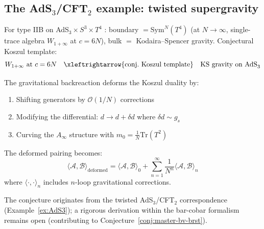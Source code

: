 \subsection{\texorpdfstring{The AdS$_3$/CFT$_2$ example: twisted supergravity}{The AdS 3/CFT 2 example: twisted supergravity}}

\begin{example}\label{ex:AdS3}
For type IIB on AdS$_3 \times S^3 \times T^4$ \cite{CP2020}: boundary $= \mathrm{Sym}^N(T^4)$ (at $N \to \infty$, single-trace algebra $W_{1+\infty}$ at $c = 6N$), bulk $=$ Kodaira--Spencer gravity.  Conjectural Koszul template:
\[W_{1+\infty} \text{ at } c = 6N \quad \xleftrightarrow{\text{conj.\ Koszul template}} \quad \text{KS gravity on AdS}_3\]
\end{example}

\begin{conjecture}\label{conj:backreaction}
The gravitational backreaction deforms the Koszul duality by:
\begin{enumerate}
\item Shifting generators by $\mathcal{O}(1/N)$ corrections
\item Modifying the differential: $d \to d + \delta d$ where $\delta d \sim g_s$
\item Curving the $A_\infty$ structure with $m_0 = \frac{1}{N}\text{Tr}(T^2)$
\end{enumerate}

The deformed pairing becomes:
\[\langle \mathcal{A}, \mathcal{B} \rangle_{\text{deformed}} = \langle \mathcal{A}, \mathcal{B} \rangle_0 + \sum_{n=1}^\infty \frac{1}{N^n} \langle \mathcal{A}, \mathcal{B} \rangle_n\]
where $\langle \cdot, \cdot \rangle_n$ includes $n$-loop gravitational corrections.
\end{conjecture}

The conjecture originates from the twisted AdS$_3$/CFT$_2$ correspondence \cite{CP2020} (Example~\ref{ex:AdS3}); a rigorous derivation within the bar-cobar formalism remains open (contributing to Conjecture~\ref{conj:master-bv-brst}).

